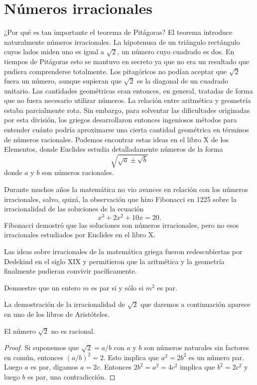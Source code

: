 \chapter{Números irracionales}

¿Por qué es tan importante el teorema de Pitágoras?  El teorema 
introduce naturalmente números irracionales. La hipotenusa de un triángulo
rectángulo cuyos lados miden uno es igual a $\sqrt{2}$, un número cuyo cuadrado
es dos.  En tiempos de Pitágoras esto se mantuvo en secreto ya que no era un
resultado que pudiera comprenderse totalmente. Los pitagóricos
no podían aceptar que $\sqrt{2}$ fuera un número, aunque supieran que $\sqrt{2}$ es
la diagonal de un cuadrado unitario. Las cantidades geométricas
eran entonces, en general, tratadas de forma que no fuera necesario utilizar números. La
relación entre aritmética y geometría estaba parcialmente rota. Sin embargo,
para solventar las dificultades originadas por esta división, los griegos
desarrollaron entonces ingeniosos métodos para entender cuánto podría
aproximarse una cierta cantidad geométrica en términos de números racionales.
Podemos encontrar estas ideas en el libro X de los Elementos, donde Euclides
estudia detalladamente números de la forma
\[
	\sqrt{\sqrt{a}\pm\sqrt{b}}
\]
donde $a$ y $b$ son números racionales. 

Durante muchos años la matemática no vio avances en relación con los números
irracionales, salvo, quizá, la observación que hizo Fibonacci en 1225 sobre la
irracionalidad de las soluciones de la ecuación 
\[
	x^3+2x^2+10x=20.
\]
Fibonacci demostró que las soluciones son números irracionales, pero no esos
irracionales estudiados por Euclides en el libro X. 

Las ideas sobre irracionales de la matemática griega fueron redescubiertas por
Dedekind en el siglo XIX y permitieron que la aritmética y la geometría
finalmente pudieran convivir pacíficamente.

\begin{exercise}
	Demuestre que un entero $m$ es par si y sólo si $m^2$ es par.
\end{exercise}

La demostración de la irracionalidad de $\sqrt{2}$ que daremos a continuación
aparece en uno de los libros de Aristóteles.

\begin{theorem}
	El número $\sqrt{2}$ no es racional.	
\end{theorem}

\begin{proof}
	Si suponemos que $\sqrt{2}=a/b$ con $a$ y $b$ son números naturales sin
	factores en común, entonces $(a/b)^2=2$. Esto implica que $a^2=2b^2$ es un
	número par. Luego $a$ es par, digamos $a=2c$. Entonces $2b^2=a^2=4c^2$
	implica que $b^2=2c^2$ y luego $b$ es par, una contradicción.
\end{proof}

